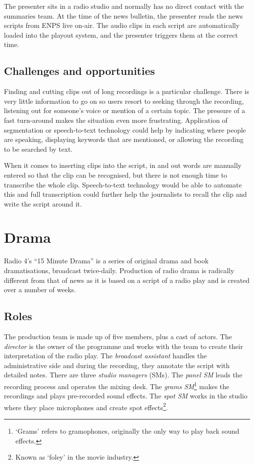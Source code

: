 The presenter sits in a radio studio and normally has no direct contact with
the summaries team. At the time of the news bulletin, the presenter reads the
news scripts from ENPS live on-air. The audio clips in each script are
automatically loaded into the playout system, and the presenter triggers them
at the correct time.

\subsection{Challenges and opportunities}
Finding and cutting clips out of long recordings is a particular challenge.
There is very little information to go on so users resort to seeking through
the recording, listening out for someone's voice or mention of a certain topic.
The pressure of a fast turn-around makes the situation even more frustrating.
Application of segmentation or speech-to-text technology could help by
indicating where people are speaking, displaying keywords that are mentioned,
or allowing the recording to be searched by text.

When it comes to inserting clips into the script, in and out words are manually
entered so that the clip can be recognised, but there is not enough time to
transcribe the whole clip. Speech-to-text technology would be able to automate
this and full transcription could further help the journalists to recall the
clip and write the script around it.

\section{Drama}\label{sec:drama}
Radio 4's ``15 Minute Drama'' is a series of original drama and book
dramatisations, broadcast twice-daily. Production of radio drama is radically
different from that of news as it is based on a script of a radio play and is
created over a number of weeks.

\subsection{Roles}
The production team is made up of five members, plus a cast of actors. The
\textit{director} is the owner of the programme and works with the team to
create their interpretation of the radio play. The \textit{broadcast assistant}
handles the administrative side and during the recording, they annotate the
script with detailed notes. There are three \textit{studio managers} (SMs). The
\textit{panel SM} leads the recording process and operates the mixing desk.
The \textit{grams SM}\footnote{`Grams' refers to gramophones, originally the
  only way to play back sound effects.} makes the recordings and plays
pre-recorded sound effects.  The \textit{spot SM} works in the studio where
they place microphones and create spot effects\footnote{Known as `foley' in the
  movie industry.}.

